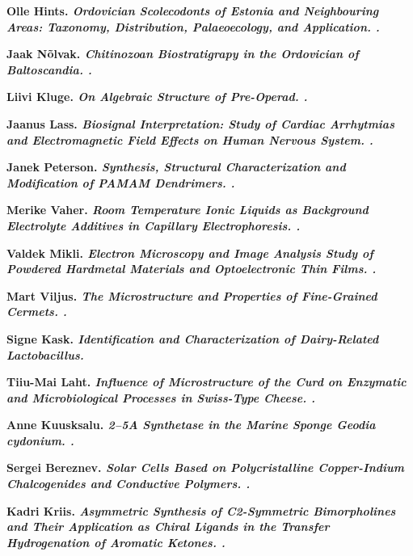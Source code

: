 \begin{list}
\item \bf Olle Hints. \it Ordovician Scolecodonts of Estonia and Neighbouring
  Areas: Taxonomy, Distribution, Palaeoecology, and Application. .

\item \bf Jaak N\~olvak. \it Chitinozoan Biostratigrapy in the Ordovician of
  Baltoscandia. .

\item \bf Liivi Kluge. \it On Algebraic Structure of Pre-Operad. .

\item \bf Jaanus Lass. \it Biosignal Interpretation: Study of Cardiac
  Arrhytmias and Electromagnetic Field Effects on Human Nervous
  System. .

\item \bf Janek Peterson. \it Synthesis, Structural Characterization and
  Modification of PAMAM Dendrimers. .

\item \bf Merike Vaher. \it Room Temperature Ionic Liquids as Background
  Electrolyte Additives in Capillary Electrophoresis. .

\item \bf Valdek Mikli. \it Electron Microscopy and Image Analysis Study of
  Powdered Hardmetal Materials and Optoelectronic Thin Films. .

\item \bf Mart Viljus. \it The Microstructure and Properties of Fine-Grained
  Cermets. .

\item \bf Signe Kask. \it Identification and Characterization of Dairy-Related
  Lactobacillus. 

\item \bf Tiiu-Mai Laht. \it Influence of Microstructure of the Curd on
  Enzymatic and Microbiological Processes in Swiss-Type Cheese. .

\item \bf Anne Kuusksalu. \it 2–5A Synthetase in the Marine Sponge Geodia
  cydonium. .

\item \bf Sergei Bereznev. \it Solar Cells Based on Polycristalline
  Copper-Indium Chalcogenides and Conductive Polymers. .

\item \bf Kadri Kriis. \it Asymmetric Synthesis of C2-Symmetric Bimorpholines
  and Their Application as Chiral Ligands in the Transfer
  Hydrogenation of Aromatic Ketones. .


\end{list}
